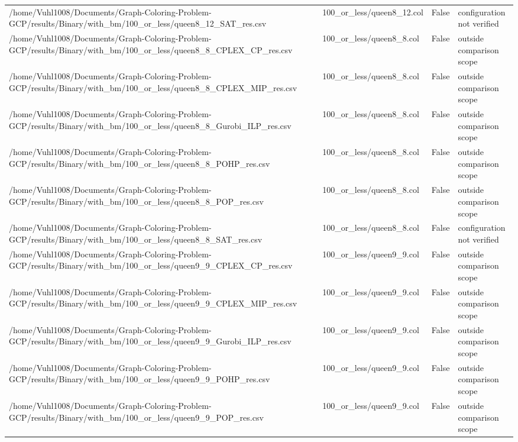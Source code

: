\begin{table}[htbp]
\begin{tabular}{llll}
/home/Vuhl1008/Documents/Graph-Coloring-Problem-GCP/results/Binary/with\_bm/100\_or\_less/queen8\_12\_SAT\_res.csv & 100\_or\_less/queen8\_12.col & False & configuration not verified \\
/home/Vuhl1008/Documents/Graph-Coloring-Problem-GCP/results/Binary/with\_bm/100\_or\_less/queen8\_8\_CPLEX\_CP\_res.csv & 100\_or\_less/queen8\_8.col & False & outside comparison scope \\
/home/Vuhl1008/Documents/Graph-Coloring-Problem-GCP/results/Binary/with\_bm/100\_or\_less/queen8\_8\_CPLEX\_MIP\_res.csv & 100\_or\_less/queen8\_8.col & False & outside comparison scope \\
/home/Vuhl1008/Documents/Graph-Coloring-Problem-GCP/results/Binary/with\_bm/100\_or\_less/queen8\_8\_Gurobi\_ILP\_res.csv & 100\_or\_less/queen8\_8.col & False & outside comparison scope \\
/home/Vuhl1008/Documents/Graph-Coloring-Problem-GCP/results/Binary/with\_bm/100\_or\_less/queen8\_8\_POHP\_res.csv & 100\_or\_less/queen8\_8.col & False & outside comparison scope \\
/home/Vuhl1008/Documents/Graph-Coloring-Problem-GCP/results/Binary/with\_bm/100\_or\_less/queen8\_8\_POP\_res.csv & 100\_or\_less/queen8\_8.col & False & outside comparison scope \\
/home/Vuhl1008/Documents/Graph-Coloring-Problem-GCP/results/Binary/with\_bm/100\_or\_less/queen8\_8\_SAT\_res.csv & 100\_or\_less/queen8\_8.col & False & configuration not verified \\
/home/Vuhl1008/Documents/Graph-Coloring-Problem-GCP/results/Binary/with\_bm/100\_or\_less/queen9\_9\_CPLEX\_CP\_res.csv & 100\_or\_less/queen9\_9.col & False & outside comparison scope \\
/home/Vuhl1008/Documents/Graph-Coloring-Problem-GCP/results/Binary/with\_bm/100\_or\_less/queen9\_9\_CPLEX\_MIP\_res.csv & 100\_or\_less/queen9\_9.col & False & outside comparison scope \\
/home/Vuhl1008/Documents/Graph-Coloring-Problem-GCP/results/Binary/with\_bm/100\_or\_less/queen9\_9\_Gurobi\_ILP\_res.csv & 100\_or\_less/queen9\_9.col & False & outside comparison scope \\
/home/Vuhl1008/Documents/Graph-Coloring-Problem-GCP/results/Binary/with\_bm/100\_or\_less/queen9\_9\_POHP\_res.csv & 100\_or\_less/queen9\_9.col & False & outside comparison scope \\
/home/Vuhl1008/Documents/Graph-Coloring-Problem-GCP/results/Binary/with\_bm/100\_or\_less/queen9\_9\_POP\_res.csv & 100\_or\_less/queen9\_9.col & False & outside comparison scope \\

\end{tabular}
\end{table}
